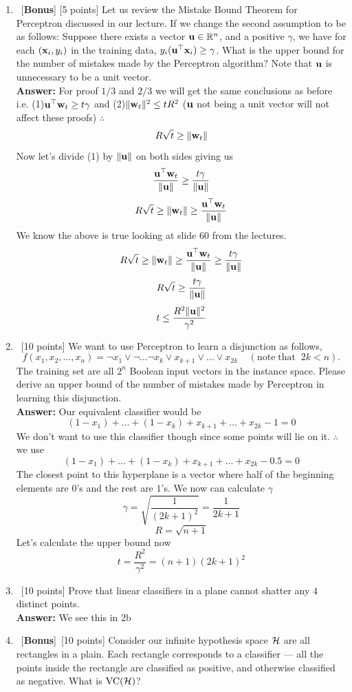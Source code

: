 \documentclass[12pt, fullpage,letterpaper]{article}
\newcommand{\Answer}{{\\\textbf{Answer: }}}
\begin{document}
\begin{enumerate}
	\item ~[\textbf{Bonus}] [5 points] Let us review the Mistake Bound Theorem for Perceptron discussed in our lecture.  If we change the second assumption to be as follows: Suppose there exists a vector ${\bf u}\in \mathbb{R}^n$, and a positive $\gamma$, we have for each $({\bf x}_i, y_i)$ in the training data, $y_i({\bf u}^\top {\bf x}_i) \ge \gamma$. What is the upper bound for the number of mistakes made by the Perceptron algorithm?   Note that ${\bf u}$ is unnecessary to be a unit vector.
	\Answer For proof $1/3$ and $2/3$ we will get the same conclusions as before i.e. (1)${\bf u}^\top{\bf w}_t \geq t\gamma$ and (2)$\lVert{\bf w}_t\rVert^2 \leq tR^2$ (${\bf u}$ not being a unit vector will not affect these proofs) $\therefore$
	\[R\sqrt{t} \geq \lVert{\bf w}_t\rVert\]
	Now let's divide (1) by $\lVert{\bf u}\rVert$ on both sides giving us
	\[\frac{{\bf u}^\top{\bf w}_t}{\lVert{\bf u}\rVert} \geq \frac{t\gamma}{\lVert{\bf u}\rVert}\]
	\[R\sqrt{t} \geq \lVert{\bf w}_t\rVert \geq \frac{{\bf u}^\top{\bf w}_t}{\lVert{\bf u}\rVert}\] We know the above is true looking at slide 60 from the lectures.
	\[R\sqrt{t} \geq \lVert{\bf w}_t\rVert \geq \frac{{\bf u}^\top{\bf w}_t}{\lVert{\bf u}\rVert} \geq \frac{t\gamma}{\lVert{\bf u}\rVert}\]
	\[R\sqrt{t} \geq \frac{t\gamma}{\lVert{\bf u}\rVert}\]
	\[t \leq \frac{R^2\lVert{\bf u}\rVert^2}{\gamma^2}\]
	
	\item~[10 points] We want to use Perceptron to learn a disjunction as follows,
	\[
	f(x_1, x_2, \ldots, x_n) = \neg x_1 \lor \neg \ldots \neg x_k \lor x_{k+1} \lor \ldots \lor x_{2k} \;\;\;\;(\mathrm{note\; that}\;\; 2k < n).
	\]
	The training set are all $2^n$ Boolean input vectors in the instance space. 
	Please derive an upper bound of the number of mistakes made by Perceptron in learning this disjunction.
	\Answer Our equivalent classifier would be
	\[(1-x_1) + \ldots + (1-x_k) + x_{k+1} + \ldots + x_{2k} - 1 = 0\]
	We don't want to use this classifier though since some points will lie on it.  $\therefore$ we use
	\[(1-x_1) + \ldots + (1-x_k) + x_{k+1} + \ldots + x_{2k} - 0.5 = 0\]
	The closest point to this hyperplane is a vector where half of the beginning elements are $0$'s and the rest are $1$'s.  We now can calculate $\gamma$
	\[\gamma = \sqrt{\frac{1}{(2k+1)^2}} = \frac{1}{2k+1}\]
	\[R = \sqrt{n + 1}\]
	Let's calculate the upper bound now
    \[t = \frac{R^2}{\gamma^2} = (n+1)(2k+1)^2\]

	\item~[10 points] Prove that linear classifiers in a plane cannot shatter any $4$ distinct points. 
	\Answer We see this in 2b
	\item~[\textbf{Bonus}]~[10 points] Consider our infinite hypothesis space $\mathcal{H}$ are all rectangles in a plain. Each rectangle corresponds to a classifier --- all the points inside the rectangle are classified as positive, and otherwise classified as negative. What is $\mathrm{VC}(\mathcal{H})$? 


\end{enumerate}
\end{document}
